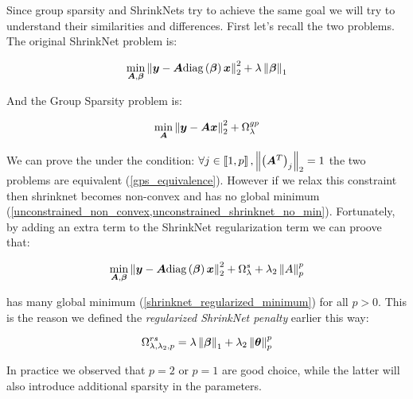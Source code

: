 Since group sparsity and ShrinkNets try to achieve the same goal we will try to understand their similarities and differences. First let's recall the two problems. The original ShrinkNet problem is:

\begin{equation}
  \min_{\bm{A}, \bm{\beta}} \left\lVert\bm{y} - \bm{A}\text{diag}\left(\bm{\beta}\right)\bm{x}\right\rVert_2^2 + \lambda \left\lVert\bm{\beta}\right\rVert_1
\end{equation}

And the Group Sparsity problem is:

\begin{equation}
  \min_{\bm{A}} \left\lVert\bm{y} - \bm{A}\bm{x}\right\rVert_2^2 + \Omega_\lambda^{gp}
\end{equation}

We can prove the under the condition: $\forall j\in \left\llbracket1, p\right\rrbracket, \left\lVert\left(\bm{A}^T\right)_j\right\rVert_2 = 1$ the two problems are equivalent (\cref{gps_equivalence}). However if we relax this constraint then shrinknet becomes non-convex and has no global minimum (\cref{unconstrained_non_convex,unconstrained_shrinknet_no_min}). Fortunately, by adding an extra term to the ShrinkNet regularization term we can proove that:

\begin{equation}
  \min_{\bm{A}, \bm{\beta}} \left\lVert\bm{y} - \bm{A}\text{diag}\left(\bm{\beta}\right)\bm{x}\right\rVert_2^2 + \Omega_\lambda^s + \lambda_2\left\lVert A\right\rVert_p^p
\end{equation}

has many global minimum (\cref{shrinknet_regularized_minimum}) for all $p>0$. This is the reason we defined the \textit{regularized ShrinkNet penalty} earlier this way:

\begin{equation}
  \Omega_{\lambda, \lambda_2, p}^{rs} = \lambda\left\lVert\bm{\beta}\right\rVert_1 + \lambda_2\left\lVert\bm\theta\right\rVert_p^p
\end{equation}

In practice we observed that $p=2$ or $p=1$ are good choice, while the latter will also introduce additional sparsity in the parameters.